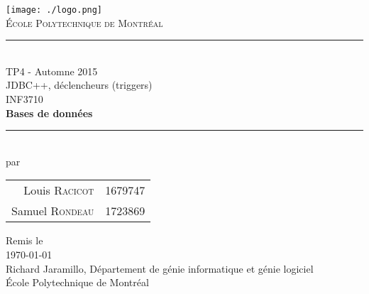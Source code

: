 \documentclass[11pt,letterpaper]{article}
\begin{document}
\begin{titlepage}
\begin{center}

\texttt{[image: ./logo.png]}~\\[1cm]

\textsc{\huge École Polytechnique de Montréal}\\[1.5cm]

\rule{0.5\linewidth}{0.5mm} \\[0.4cm]
{\LARGE TP4 - Automne 2015}\\[0.4cm]
{\Large JDBC++, déclencheurs (triggers)}\\[1.0cm]

{\large INF3710}\\[0.4cm]
{\large \textbf{Bases de données}}\\[0.4cm]

\rule{0.5\linewidth}{0.5mm} \\[1.0cm]

{\large par}\\[0.6cm]
\begin{Large}
  \begin{tabular}{r l}
    Louis \textsc{Racicot} & 1679747\\[0.4cm]
    Samuel \textsc{Rondeau} & 1723869\\[0.4cm]
  \end{tabular}
\end{Large}


\vfill

{\large Remis le}\\[0.3cm]
{\Large \today}\\[1.5cm]
{\large Richard Jaramillo, Département de génie informatique et génie logiciel}\\[0.3cm]
{\large École Polytechnique de Montréal}

\end{center}
\end{titlepage}



\newpage
\end{document}
